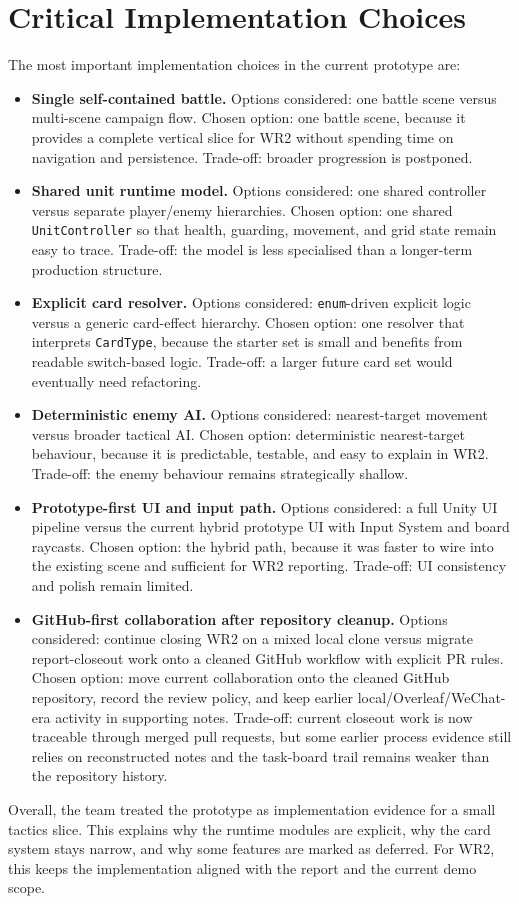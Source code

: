 \section{Critical Implementation Choices}

The most important implementation choices in the current prototype are:

\begin{itemize}
\item \textbf{Single self-contained battle.} Options considered: one battle scene versus multi-scene campaign flow. Chosen option: one battle scene, because it provides a complete vertical slice for WR2 without spending time on navigation and persistence. Trade-off: broader progression is postponed.
\item \textbf{Shared unit runtime model.} Options considered: one shared controller versus separate player/enemy hierarchies. Chosen option: one shared \texttt{UnitController} so that health, guarding, movement, and grid state remain easy to trace. Trade-off: the model is less specialised than a longer-term production structure.
\item \textbf{Explicit card resolver.} Options considered: \texttt{enum}-driven explicit logic versus a generic card-effect hierarchy. Chosen option: one resolver that interprets \texttt{CardType}, because the starter set is small and benefits from readable switch-based logic. Trade-off: a larger future card set would eventually need refactoring.
\item \textbf{Deterministic enemy AI.} Options considered: nearest-target movement versus broader tactical AI. Chosen option: deterministic nearest-target behaviour, because it is predictable, testable, and easy to explain in WR2. Trade-off: the enemy behaviour remains strategically shallow.
\item \textbf{Prototype-first UI and input path.} Options considered: a full Unity UI pipeline versus the current hybrid prototype UI with Input System and board raycasts. Chosen option: the hybrid path, because it was faster to wire into the existing scene and sufficient for WR2 reporting. Trade-off: UI consistency and polish remain limited.
\item \textbf{GitHub-first collaboration after repository cleanup.} Options considered: continue closing WR2 on a mixed local clone versus migrate report-closeout work onto a cleaned GitHub workflow with explicit PR rules. Chosen option: move current collaboration onto the cleaned GitHub repository, record the review policy, and keep earlier local/Overleaf/WeChat-era activity in supporting notes. Trade-off: current closeout work is now traceable through merged pull requests, but some earlier process evidence still relies on reconstructed notes and the task-board trail remains weaker than the repository history.
\end{itemize}

Overall, the team treated the prototype as implementation evidence for a small tactics slice. This explains why the runtime modules are explicit, why the card system stays narrow, and why some features are marked as deferred. For WR2, this keeps the implementation aligned with the report and the current demo scope.
